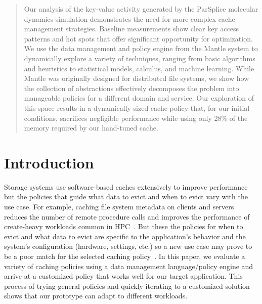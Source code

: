 \begin{abstract}

Our analysis of the key-value activity generated by the ParSplice molecular
dynamics simulation demonstrates the need for more complex cache management
strategies. Baseline measurements show clear key access patterns and hot
spots that offer significant opportunity for optimization. We use the data
management and policy engine from the Mantle system to dynamically explore a
variety of techniques, ranging from basic algorithms and heuristics to
statistical models, calculus, and machine learning. While Mantle was originally
designed for distributed file systems, we show how the collection of
abstractions effectively decomposes the problem into manageable policies for a
different domain and service.  Our exploration of this space results in a
dynamically sized cache policy that, for our initial conditions, sacrifices
negligible performance while using only 28\% of the memory required by our
hand-tuned cache.

\end{abstract}

\section{Introduction}

Storage systems use software-based caches extensively to improve performance
but the policies that guide what data to evict and when to evict vary with the
use case. For example, caching file system metadata on clients and servers
reduces the number of remote procedure calls and improves the performance of
create-heavy workloads common in HPC~\cite{ren:sc2014-indexfs,
patil:fast2011-giga+}. But these the policies for when to evict and what data
to evict are specific to the application's behavior and the system's
configuration (hardware, settings, etc.) so a new use case may prove to be a
poor match for the selected caching
policy~\cite{xiao:socc15-shardfs,brandt:msst2003-lh,sevilla:sc15-mantle,
weil:sc2004-dyn-metadata, weil:osdi2006-ceph}. In this paper, we evaluate a
variety of caching policies using a data management language/policy engine and
arrive at a customized policy that works well for our target application.  This
process of trying general policies and quickly iterating to a customized
solution shows that our prototype can adapt to different workloads.


